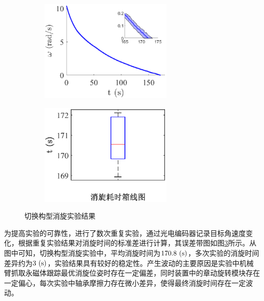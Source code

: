 \documentclass[lang=chs, degree=master, blindreview=false, winfonts=true]{yanputhesis}
\begin{document}
\begin{figure}[htb]
	\centering
	\begin{minipage}[t]{0.96\textwidth}
		\centering
		\begin{subfigure}[t]{0.47\textwidth}
			\centering
			\includegraphics[width = 2.5in]{picture/changepose_errbar.eps}
			\caption{ }
			\label{fig:changepose_errbar}
		\end{subfigure}\hfill
		\begin{subfigure}[t]{0.47\textwidth}
			\centering
			\includegraphics[width = 2.5in]{picture/changepose_boxline.eps}
			\caption{ }
			\label{fig:changepose_boxline}
		\end{subfigure}
	\end{minipage}
	\caption{切换构型消旋实验结果\label{Fig.changepose_result}}
\end{figure}

为提高实验的可靠性，进行了数次重复实验，通过光电编码器记录目标角速度变化，根据重复实验结果对消旋时间的标准差进行计算，其误差带图如图\ref{Fig.changepose_result}所示。从图中可知，切换构型消旋实验中，平均消旋时间为$170.8\ \rm{(s)}$，多次实验的消旋时间差异约为$3\ \rm{(s)}$，实验结果具有较好的稳定性。产生波动的主要原因是实验中机械臂抓取永磁体跟踪最优消旋位姿时存在一定偏差，同时装置中的章动旋转模块存在一定偏心，每次实验中轴承摩擦力存在微小差异，使得最终消旋时间存在一定波动。
\end{document}

